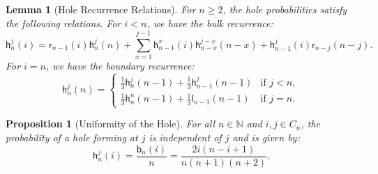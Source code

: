 \documentclass[10pt,a4paper]{amsart}
\newtheorem{lemma}{Lemma}
\newtheorem{proposition}{Proposition}
\newcommand{\N}{\mathbb{N}}
\newcommand{\sgrboth}[2]{\mathsf{b}_{#1}(#2)}
\newcommand{\sgrleft}[2]{\mathsf{l}_{#1}(#2)}
\newcommand{\sgrright}[2]{\mathsf{r}_{#1}(#2)}
\begin{document}
\begin{lemma}[Hole Recurrence Relations]\label{lemma:hole-recurrence}
    For $n \ge 2$, the hole probabilities satisfy the following relations. 
    For $i < n$, we have the bulk recurrence:
    \begin{equation*}
        \mathsf{h}_n^j(i) = \sgrright{n-1}{i}\mathsf{h}_n^j(n) + \sum_{x=1}^{j-1} \mathsf{h}_{n-1}^x(i)\mathsf{h}_{n-x}^{j-x}(n-x) + \mathsf{h}_{n-1}^j(i)\sgrright{n-j}{n-j}.
    \end{equation*}
    For $i=n$, we have the boundary recurrence:
    \begin{equation*}
        \mathsf{h}_n^j(n) = 
        \begin{cases}
            \frac{1}{3}\mathsf{h}_n^j(n-1) + \frac{1}{3}\mathsf{h}_{n-1}^j(n-1) & \text{if } j < n, \\
            \frac{1}{3}\mathsf{h}_n^n(n-1) + \frac{1}{3}\sgrleft{n-1}{n-1} & \text{if } j = n.
        \end{cases}
    \end{equation*}
\end{lemma}

\begin{proposition}[Uniformity of the Hole]\label{prop:hole-uniformity}
    For all $n \in \N$ and $i, j \in C_n$, the probability of a hole forming at $j$ is independent of $j$ and is given by:
    \begin{equation*}
        \mathsf{h}_n^j(i) = \frac{\sgrboth{n}{i}}{n} = \frac{2i(n-i+1)}{n(n+1)(n+2)}.
    \end{equation*}
\end{proposition}
\end{document}
